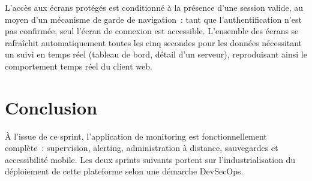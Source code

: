 L'accès aux écrans protégés est conditionné à la présence d'une session valide, au moyen d'un mécanisme de garde de navigation~: tant que l'authentification n'est pas confirmée, seul l'écran de connexion est accessible. L'ensemble des écrans se rafraîchit automatiquement toutes les cinq secondes pour les données nécessitant un suivi en temps réel (tableau de bord, détail d'un serveur), reproduisant ainsi le comportement temps réel du client web.

\section*{Conclusion}

À l'issue de ce sprint, l'application de monitoring est fonctionnellement complète~: supervision, alerting, administration à distance, sauvegardes et accessibilité mobile. Les deux sprints suivants portent sur l'industrialisation du déploiement de cette plateforme selon une démarche DevSecOps.

